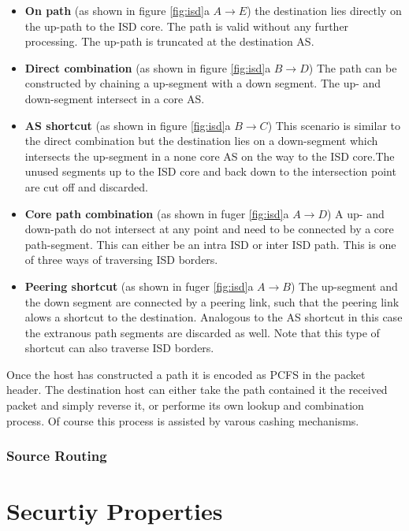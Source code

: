 \documentclass[../eva1_scion.tex]{subfiles}
\begin{document}
    \begin{itemize}
        \item \textbf{On path} (as shown in figure \ref{fig:isd}a $A \rightarrow E$) the destination lies directly on the up-path to the ISD core. The path is valid without any further processing. The up-path is truncated at the destination AS.
        \item \textbf{Direct combination} (as shown in figure \ref{fig:isd}a $B \rightarrow D$) The path can be constructed by chaining a up-segment with a down segment. The up- and down-segment intersect in a core AS.
        \item \textbf{AS shortcut} (as shown in figure \ref{fig:isd}a $B \rightarrow C$) This scenario is similar to the direct combination but the destination lies on a down-segment which intersects the up-segment in a none core AS on the way to the ISD core.The unused segments up to the ISD core and back down to the intersection point are cut off and discarded.
        \item \textbf{Core path combination} (as shown in fuger \ref{fig:isd}a $A \rightarrow D$) A up- and down-path do not intersect at any point and need to be connected by a core path-segment. This can either be an intra ISD or inter ISD path. This is one of three ways of traversing ISD borders.
        \item \textbf{Peering shortcut} (as shown in fuger \ref{fig:isd}a $A \rightarrow B$) The up-segment and the down segment are connected by a peering link, such that the peering link alows a shortcut to the destination. Analogous to the AS shortcut in this case the extranous path segments are discarded as well. Note that this type of shortcut can also traverse ISD borders.
    \end{itemize}

    Once the host has constructed a path it is encoded as PCFS in the packet header. The destination host can either take the path contained it the received packet and simply reverse it, or performe its own lookup and combination process. Of course this process is assisted by varous cashing mechanisms.

    \subsubsection{Source Routing}


    \section{Securtiy Properties}
\end{document}
